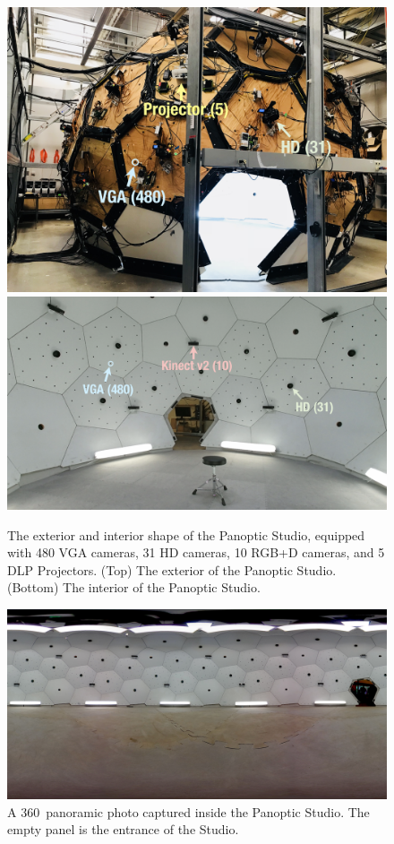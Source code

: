 \begin{figure}
	\centering       
	\includegraphics[trim=0 0 0 0,clip,width=\linewidth]{fig_system/dome_exterior2_label}
	\includegraphics[trim=0 0 0 0,clip,width=\linewidth]{fig_system/panoptic_inside}	
	\caption{The exterior and interior shape of the Panoptic Studio, equipped with  480 VGA cameras, 31 HD cameras, 10 RGB+D cameras, and 5 DLP Projectors. (Top) The exterior of the Panoptic Studio. (Bottom) The interior of the Panoptic Studio.} 
	\label{fig:dome_ext_int}
\end{figure}

\begin{figure}
	\centering       
	\includegraphics[trim=0 0 0 0,clip,width=\linewidth]{fig_system/dome_pano}	
	\caption{A 360\degree~panoramic photo captured inside the Panoptic Studio. The empty panel is the entrance of the Studio.} 
	\label{fig:dome_panorama}
\end{figure}


